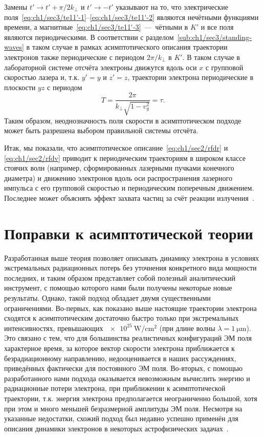 Замены $t' \rightarrow t' + \pi / 2 k_\perp$ и $t' \rightarrow -t'$ указывают на то, что электрические поля~\eqref{eq:ch1/sec3/te11'-1}--\eqref{eq:ch1/sec3/te11'-2} являются нечётными функциями времени, а магнитные~\eqref{eq:ch1/sec3/te11'-3}~---~чётными в $K'$ и все поля являются периодическими. В соответствии с разделом~\ref{sub:ch1/sec3/standing-waves} в таком случае в рамках асимптотического описания траектории электронов также периодические с периодом $2 \pi / k_\perp$ в $K'$. В таком случае в лабораторной системе отсчёта электроны движутся вдоль оси $x$ с групповой скоростью лазера и, т.к. $y' = y$ и $z' = z$, траектории электрона периодические в плоскости $yz$ с периодом
\begin{equation}
    T = \frac{2 \pi}{k_\perp \sqrt{1 - v_g^2}} = \tau.
\end{equation}
Таким образом, неоднозначность поля скорости в асимптотическом подходе может быть разрешена выбором правильной системы отсчёта.

Итак, мы показали, что асимптотическое описание~\eqref{eq:ch1/sec2/rfdr} и \eqref{eq:ch1/sec2/rfdv} приводит к периодическим траекториям в широком классе стоячих волн (например, сформированных лазерными пучками конечного диаметра) и движению электронов вдоль оси распространения лазерного импульса с его групповой скоростью и периодическим поперечным движением.
Последнее может объяснять эффект захвата частиц за счёт реакции излучения~\cite{Ji14b}.


\section{Поправки к асимптотической теории}
\label{sec:ch1/sec4}

Разработанная выше теория позволяет описывать динамику электрона в условиях экстремальных радиационных потерь без уточнения конкретного вида мощности последних, и таким образом представляет собой полезный аналитический инструмент, с помощью которого нами были получены некоторые новые результаты.
Однако, такой подход обладает двумя существенными ограничениями.
Во-первых, как показано выше настоящие траектории электрона сходятся к асимптотическим достаточно быстро только при экстремальных интенсивностях, превышающих $\SI{e25}{\watt/\centi\meter^2}$ (при длине волны $\lambda=\SI{1}{\um}$).
Это связано с тем, что для большинства реалистичных конфигураций ЭМ поля характерное время, за которое вектор скорости электрона приближается к безрадиационному направлению, недооценивается в наших рассуждениях, приведённых фактически для постоянного ЭМ поля.
Во-вторых, с помощью разработанного нами подхода оказывается невозможным вычислить энергию и радиационные потери электрона, при приближении к асимптотической траектории, т.к. энергия электрона предполагается неограниченно большой, хотя при этом и много меньшей безразмерной амплитуды ЭМ поля.
Несмотря на указанные недостатки, схожий подход был недавно успешно применён для описания динамики электронов в некоторых астрофизических задачах~\cite{jerome2022particle}.

